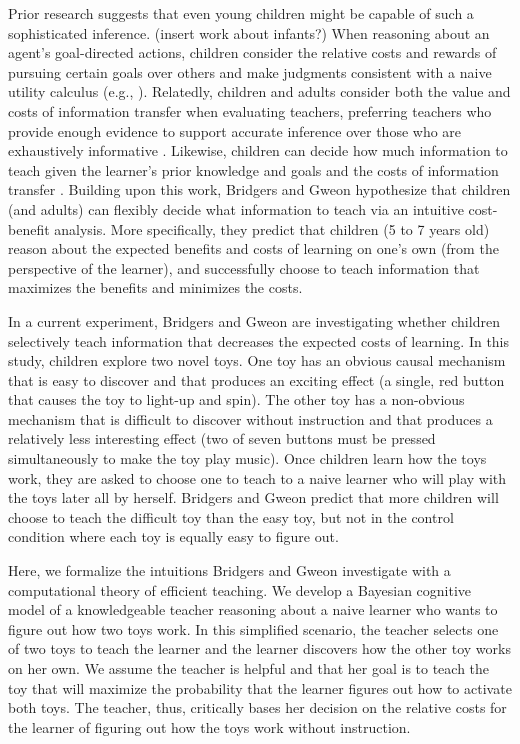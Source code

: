 \documentclass[10pt,letterpaper]{article}
\begin{document}
Prior research suggests that even young children might be capable of such a sophisticated inference. (insert work about infants?) When reasoning about an agent's goal-directed actions, children consider the relative costs and rewards of pursuing certain goals over others and make judgments consistent with a naive utility calculus (e.g., \cite{JaraEttinger2015}). Relatedly, children and adults consider both the value and costs of information transfer when evaluating teachers, preferring teachers who provide enough evidence to support accurate inference over those who are exhaustively informative \cite{GweonReview, Shafto2012}. Likewise, children can decide how much information to teach given the learner's prior knowledge and goals and the costs of information transfer \cite{GweonSchulz2014}. Building upon this work, Bridgers and Gweon hypothesize that children (and adults) can flexibly decide what information to teach via an intuitive cost-benefit analysis. More specifically, they predict that children (5 to 7 years old) reason about the expected benefits and costs of learning on one's own (from the perspective of the learner), and successfully choose to teach information that maximizes the benefits and minimizes the costs. 

In a current experiment, Bridgers and Gweon are investigating whether children selectively teach information that decreases the expected costs of learning. In this study, children explore two novel toys. One toy has an obvious causal mechanism that is easy to discover and that produces an exciting effect (a single, red button that causes the toy to light-up and spin). The other toy has a non-obvious mechanism that is difficult to discover without instruction and that produces a relatively less interesting effect (two of seven buttons must be pressed simultaneously to make the toy play music). Once children learn how the toys work, they are asked to choose one to teach to a naive learner who will play with the toys later all by herself. Bridgers and Gweon predict that more children will choose to teach the difficult toy than the easy toy, but not in the control condition where each toy is equally easy to figure out.

Here, we formalize the intuitions Bridgers and Gweon investigate with a computational theory of efficient teaching. We develop a Bayesian cognitive model of a knowledgeable teacher reasoning about a naive learner who wants to figure out how two toys work. In this simplified scenario, the teacher selects one of two toys to teach the learner and the learner discovers how the other toy works on her own. We assume the teacher is helpful and that her goal is to teach the toy that will maximize the probability that the learner figures out how to activate both toys. The teacher, thus, critically bases her decision on the relative costs for the learner of figuring out how the toys work without instruction. 
\end{document}
